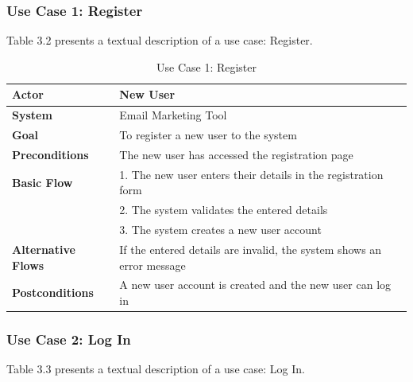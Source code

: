 \subsubsection{Use Case 1: Register}

Table 3.2 presents a textual description of a use case: Register.

\begin{table}[ht]
	\centering
	\begin{tabularx}{\textwidth}{|l|X|}
		\hline
		\textbf{Actor}             & New User                                                              \\
		\hline
		\textbf{System}            & Email Marketing Tool                                                  \\
		\hline
		\textbf{Goal}              & To register a new user to the system                                  \\
		\hline
		\textbf{Preconditions}     & The new user has accessed the registration page                       \\
		\hline
		\textbf{Basic Flow}        & 1. The new user enters their details in the registration form         \\
		                           & 2. The system validates the entered details                           \\
		                           & 3. The system creates a new user account                              \\
		\hline
		\textbf{Alternative Flows} & If the entered details are invalid, the system shows an error message \\
		\hline
		\textbf{Postconditions}    & A new user account is created and the new user can log in           \\
		\hline
	\end{tabularx}
	\caption{Use Case 1: Register}
	\label{tab:Use Case 1 Register}
\end{table}

\subsubsection{Use Case 2: Log In}

Table 3.3 presents a textual description of a use case: Log In.

